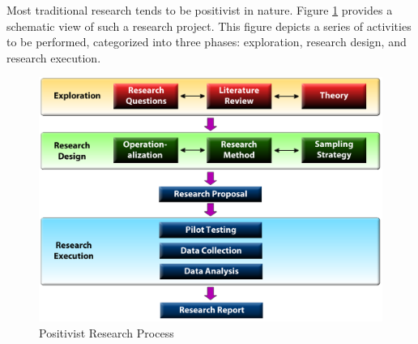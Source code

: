 Most traditional research tends to be positivist in nature. Figure \ref{fig04.01} provides a schematic view of such a research project. This figure depicts a series of activities to be performed, categorized into three phases: exploration, research design, and research execution. 

\begin{figure}[H]
	\centering
	\includegraphics[width=\linewidth]{gfx/04-01}
	\caption{Positivist Research Process}
	\label{fig04.01}
\end{figure}

